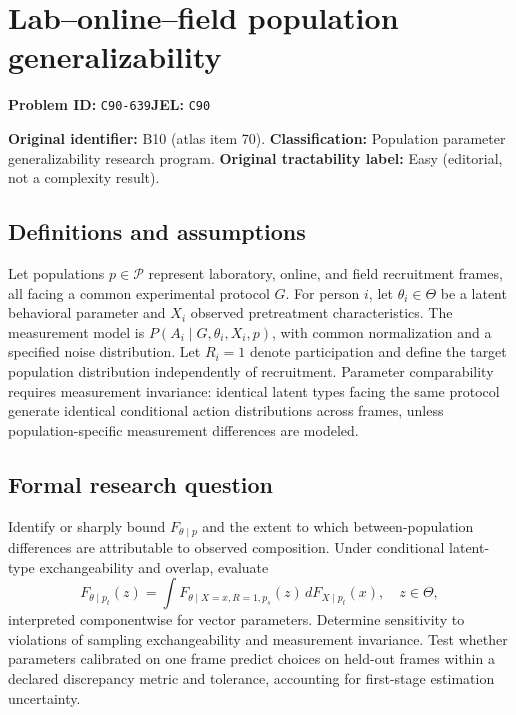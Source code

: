 \documentclass[11pt,a4paper]{article}
\begin{document}
\section*{Lab–online–field population generalizability}
\textbf{Problem ID:} \texttt{C90-639}\quad \textbf{JEL:} \texttt{C90}\par
\label{problem:OP-0070}
\label{atlas:prob:B10}

\noindent\textbf{Original identifier:} B10 (atlas item 70). \textbf{Classification:} Population parameter generalizability research program. \textbf{Original tractability label:} Easy (editorial, not a complexity result).

\subsection*{Definitions and assumptions}

Let populations $p\in\mathcal P$ represent laboratory, online, and field recruitment frames, all facing a common experimental protocol $G$. For person $i$, let $\theta_i\in\Theta$ be a latent behavioral parameter and $X_i$ observed pretreatment characteristics. The measurement model is $P(A_i\mid G,\theta_i,X_i,p)$, with common normalization and a specified noise distribution. Let $R_i=1$ denote participation and define the target population distribution independently of recruitment. Parameter comparability requires measurement invariance: identical latent types facing the same protocol generate identical conditional action distributions across frames, unless population-specific measurement differences are modeled.

\subsection*{Formal research question}

Identify or sharply bound $F_{\theta\mid p}$ and the extent to which between-population differences are attributable to observed composition. Under conditional latent-type exchangeability and overlap, evaluate
\[
F_{\theta\mid p_t}(z)=\int F_{\theta\mid X=x,R=1,p_s}(z)\,dF_{X\mid p_t}(x),\quad z\in\Theta,
\]
interpreted componentwise for vector parameters. Determine sensitivity to violations of sampling exchangeability and measurement invariance. Test whether parameters calibrated on one frame predict choices on held-out frames within a declared discrepancy metric and tolerance, accounting for first-stage estimation uncertainty.
\end{document}
